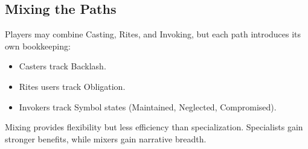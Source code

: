 \subsection{Mixing the Paths}
Players may combine Casting, Rites, and Invoking, but each path introduces its own bookkeeping:
\begin{itemize}
  \item Casters track Backlash. 
  \item Rites users track Obligation. 
  \item Invokers track Symbol states (Maintained, Neglected, Compromised). 
\end{itemize}
Mixing provides flexibility but less efficiency than specialization. Specialists gain stronger benefits, while mixers gain narrative breadth.
